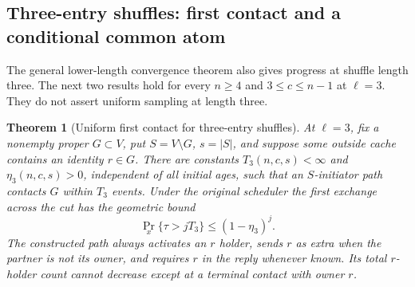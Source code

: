 \documentclass[11pt]{article}
\newtheorem{theorem}{Theorem}
\begin{document}
\subsection{Three-entry shuffles: first contact and a conditional common atom}

The general lower-length convergence theorem also gives
progress at shuffle length three. The next two results
hold for every $n\ge4$ and $3\le c\le n-1$ at $\ell=3$.
They do not assert uniform sampling at length three.

\begin{theorem}[Uniform first contact for three-entry shuffles]
\label{thm:threefirstcontact}
At $\ell=3$, fix a nonempty proper
$G\subset V$, put $S=V\setminus G$, $s=|S|$, and
suppose some outside cache contains an identity $r\in G$.
There are constants $T_3(n,c,s)<\infty$ and
$\eta_3(n,c,s)>0$, independent of all initial ages,
such that an $S$-initiator path contacts $G$ within $T_3$
events. Under the original scheduler the first exchange
across the cut has the geometric bound
\[
 \Pr_x\{\tau>jT_3\}\le(1-\eta_3)^j.
\]
The constructed path always activates an $r$ holder,
sends $r$ as extra when the partner is not its owner,
and requires $r$ in the reply whenever known. Its total
$r$-holder count cannot decrease except at a terminal
contact with owner $r$.
\end{theorem}
\end{document}
